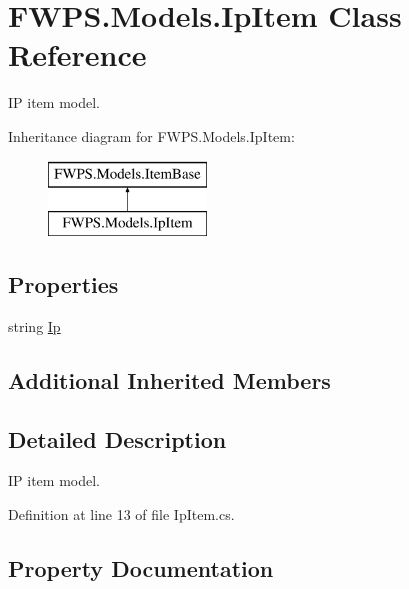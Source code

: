 \hypertarget{class_f_w_p_s_1_1_models_1_1_ip_item}{}\section{F\+W\+P\+S.\+Models.\+Ip\+Item Class Reference}
\label{class_f_w_p_s_1_1_models_1_1_ip_item}


IP item model.  


Inheritance diagram for F\+W\+P\+S.\+Models.\+Ip\+Item\+:\begin{figure}[H]
\begin{center}
\leavevmode
\includegraphics[height=2.000000cm]{class_f_w_p_s_1_1_models_1_1_ip_item}
\end{center}
\end{figure}
\subsection*{Properties}
\begin{DoxyCompactItemize}
\item 
string \mbox{\hyperlink{class_f_w_p_s_1_1_models_1_1_ip_item_af290e6b32146693b09addde0abb18b2b}{Ip}}
\end{DoxyCompactItemize}
\subsection*{Additional Inherited Members}


\subsection{Detailed Description}
IP item model. 

Definition at line 13 of file Ip\+Item.\+cs.



\subsection{Property Documentation}
\mbox{\label{class_f_w_p_s_1_1_models_1_1_ip_item_af290e6b32146693b09addde0abb18b2b}} 
